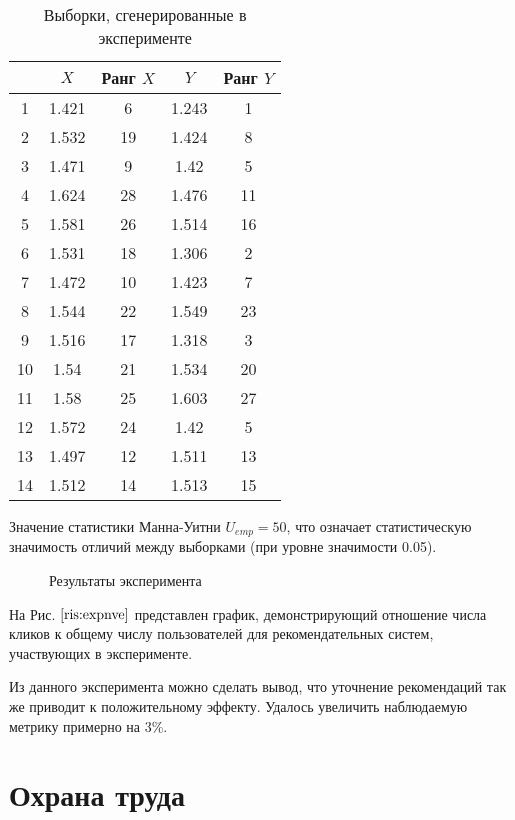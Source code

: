 \documentclass[12pt,a4paper]{report}
\begin{document}
\begin{table} [H]
\label{tabular:normalvsemexp}
\begin{center}
\begin{tabular}{|c|c|c|c|c|}
\hline
 & $X$ & Ранг $X$ & $Y$ & Ранг $Y$   \\
  \hline
 1&1.421&6&1.243&1\\
 \hline
 2&1.532&19&1.424&8\\
 \hline
 3&1.471&9&1.42&5\\
 \hline
 4&1.624&28&1.476&11\\
 \hline
 5&1.581&26&1.514&16\\
 \hline
 6&1.531&18&1.306&2\\
 \hline
 7&1.472&10&1.423&7\\
 \hline
 8&1.544&22&1.549&23\\
 \hline
 9&1.516&17&1.318&3\\
 \hline
 10&1.54&21&1.534&20\\
 \hline
 11&1.58&25&1.603&27\\
 \hline
 12&1.572&24&1.42&5\\
 \hline
 13&1.497&12&1.511&13\\
 \hline
 14&1.512&14&1.513&15\\
 \hline
\end{tabular}
\end{center}
\caption{Выборки, сгенерированные в эксперименте}
\end{table}

Значение статистики Манна-Уитни $U_{emp} = 50$, что означает статистическую значимость отличий между выборками (при уровне значимости 0.05). 

\begin{figure}[H]
\caption{Результаты эксперимента}
\label{ris:expnve}
\end{figure}

На Рис. $\ref{ris:expnve}$ представлен график, демонстрирующий отношение числа кликов к общему числу пользователей для рекомендательных систем, участвующих в эксперименте.

Из данного эксперимента можно сделать вывод, что уточнение рекомендаций так же приводит к положительному эффекту. Удалось увеличить наблюдаемую метрику примерно на 3\%.

\chapter{Охрана труда}
\end{document}
